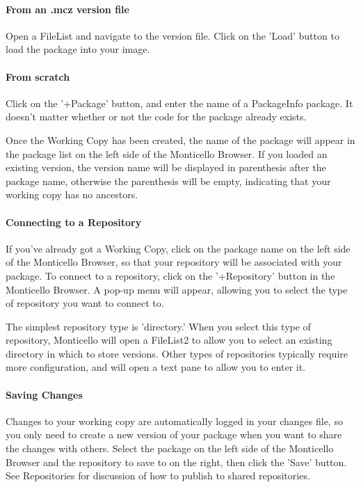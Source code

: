 \documentclass[a4paper,10pt,twoside]{book}
\begin{document}
\paragraph{From an .mcz version file}
Open a FileList and navigate to the version file. Click on the 'Load' button to load the package into your image.

\paragraph{From scratch}

Click on the '+Package' button, and enter the name of a PackageInfo package. It doesn't matter whether or not the code for the package already exists.

Once the Working Copy has been created, the name of the package will appear in the package list on the left side of the Monticello Browser. If you loaded an existing version, the version name will be displayed in parenthesis after the package name, otherwise the parenthesis will be empty, indicating that your working copy has no ancestors.

\paragraph{Connecting to a Repository}

If you've already got a Working Copy, click on the package name on the left side of the Monticello Browser, so that your repository will be associated with your package. To connect to a repository, click on the '+Repository' button in the Monticello Browser. A pop-up menu will appear, allowing you to select the type of repository you want to connect to.

The simplest repository type is 'directory.' When you select this type of repository, Monticello will open a FileList2 to allow you to select an existing directory in which to store versions. Other types of repositories typically require more configuration, and will open a text pane to allow you to enter it.

\paragraph{Saving Changes}

Changes to your working copy are automatically logged in your changes file, so you only need to create a new version of your package when you want to share the changes with others. Select the package on the left side of the Monticello Browser and the repository to save to on the right, then click the 'Save' button. See Repositories for discussion of how to publish to shared repositories.
\end{document}

